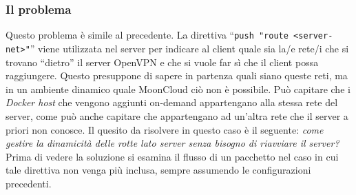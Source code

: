 \subsubsection{Il problema}
Questo problema è simile al precedente. La direttiva ``\texttt{push "route <server-net>"}''
viene utilizzata nel server per indicare al client quale sia la/e rete/i che si trovano
``dietro'' il server OpenVPN e che si vuole far sì che il client possa raggiungere.
Questo presuppone di sapere in partenza quali siano queste reti, ma in un ambiente
dinamico quale MoonCloud ciò non è possibile. Può capitare che i \textit{Docker host}
che vengono aggiunti on-demand appartengano alla stessa rete del server, come
può anche capitare che appartengano ad un'altra rete che il server a priori non conosce.
Il quesito da
risolvere in questo caso è il seguente: \textit{come gestire la dinamicità delle rotte
lato server senza bisogno di riavviare il server?}
Prima di vedere la soluzione si esamina il flusso di un pacchetto nel caso in cui
tale direttiva non venga più inclusa, sempre assumendo le configurazioni precedenti.
